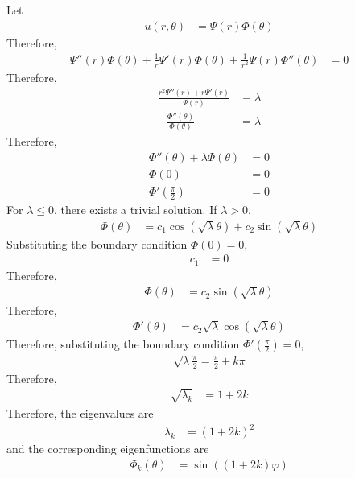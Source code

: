 \documentclass[titlepage, fleqn, a4paper, 12pt, twoside]{article}
\theoremstyle{definition}
\theoremstyle{theorem}
\begin{document}
\begin{solution}
	Let
	\begin{align*}
		u(r,\theta) & = \Psi(r) \Phi(\theta)
	\end{align*}
	Therefore,
	\begin{align*}
		\Psi''(r) \Phi(\theta) + \frac{1}{r} \Psi'(r) \Phi(\theta) + \frac{1}{r^2} \Psi(r) \Phi''(\theta) & = 0
	\end{align*}
	Therefore,
	\begin{align*}
		\frac{r^2 \Psi''(r) + r \Psi'(r)}{\Psi(r)} & = \lambda \\
		-\frac{\Phi''(\theta)}{\Phi(\theta)}       & = \lambda
	\end{align*}
	Therefore,
	\begin{align*}
		\Phi''(\theta) + \lambda \Phi(\theta) & = 0 \\
		\Phi(0)                               & = 0 \\
		\Phi'\left( \frac{\pi}{2} \right)     & = 0
	\end{align*}
	For $\lambda \le 0$, there exists a trivial solution.
	If $\lambda > 0$,
	\begin{align*}
		\Phi(\theta) & = c_1 \cos\left( \sqrt{\lambda} \theta \right) + c_2 \sin\left( \sqrt{\lambda} \theta \right)
	\end{align*}
	Substituting the boundary condition $\Phi(0) = 0$,
	\begin{align*}
		c_1 & = 0
	\end{align*}
	Therefore,
	\begin{align*}
		\Phi(\theta) & = c_2 \sin\left( \sqrt{\lambda} \theta \right)
	\end{align*}
	Therefore,
	\begin{align*}
		\Phi'(\theta) & = c_2 \sqrt{\lambda} \cos\left( \sqrt{\lambda} \theta \right)
	\end{align*}
	Therefore, substituting the boundary condition $\Phi'\left( \frac{\pi}{2} \right) = 0$,
	\begin{align*}
		\sqrt{\lambda} \frac{\pi}{2} = \frac{\pi}{2} + k \pi
	\end{align*}
	Therefore,
	\begin{align*}
		\sqrt{\lambda_k} & = 1 + 2 k
	\end{align*}
	Therefore, the eigenvalues are
	\begin{align*}
		\lambda_k & = (1 + 2 k)^2
	\end{align*}
	and the corresponding eigenfunctions are
	\begin{align*}
		\Phi_k(\theta) & = \sin\left( (1 + 2 k) \varphi \right)

\end{align*}
\end{solution}
\end{document}
